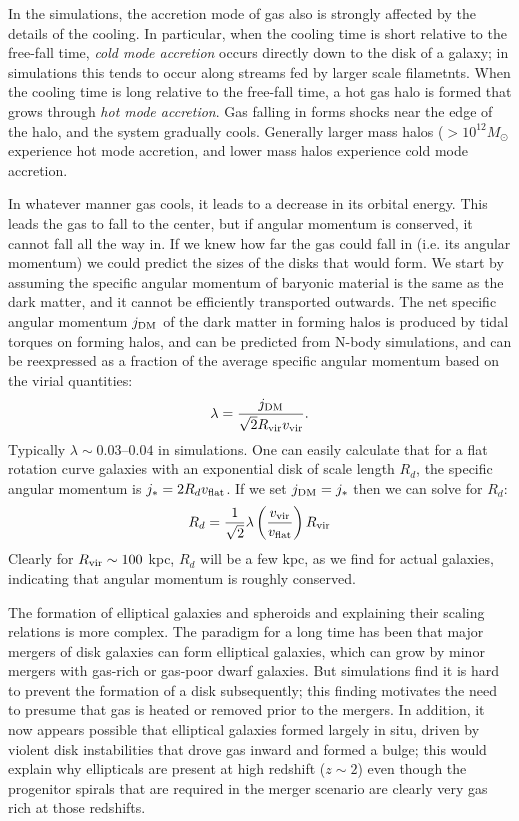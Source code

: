In the simulations, the accretion mode of gas also is strongly
affected by the details of the cooling. In particular, when the
cooling time is short relative to the free-fall time, {\it cold mode
accretion} occurs directly down to the disk of a galaxy; in
simulations this tends to occur along streams fed by larger scale
filametnts. When the cooling time is long relative to the free-fall
time, a hot gas halo is formed that grows through {\it hot mode
accretion}. Gas falling in forms shocks near the edge of the halo, and
the system gradually cools. Generally larger mass halos ($>10^{12}
M_\odot$ experience hot mode accretion, and lower mass halos
experience cold mode accretion. 

In whatever manner gas cools, it leads to a decrease in its orbital
energy. This leads the gas to fall to the center, but if angular
momentum is conserved, it cannot fall all the way in. If we knew how
far the gas could fall in (i.e. its angular momentum) we could predict
the sizes of the disks that would form. We start by assuming the
specific angular momentum of baryonic material is the same as the dark
matter, and it cannot be efficiently transported outwards. The net
specific angular momentum $j_{\rm DM}$ of the dark matter in forming
halos is produced by tidal torques on forming halos, and can be
predicted from N-body simulations, and can be reexpressed as a
fraction of the average specific angular momentum based on the virial
quantities:
\begin{equation}
\lambda = \frac{j_{\rm DM}}{\sqrt{2} R_{\rm vir} v_{\rm vir}}.
\end{equation}
Typically $\lambda \sim 0.03$--$0.04$ in simulations. One can easily
calculate that for a flat rotation curve galaxies with an exponential
disk of scale length $R_d$, the specific angular momentum is $j_\ast =
2 R_d v_{\rm flat}$. If we set $j_{\rm DM} = j_\ast$ then we can solve
for $R_d$:
\begin{equation}
R_d = \frac{1}{\sqrt{2}} \lambda \left(\frac{v_{\rm vir}}{v_{\rm
flat}}\right) R_{\rm vir}
\end{equation}
Clearly for $R_{\rm vir} \sim 100$ kpc, $R_d$ will be a few kpc, as we
find for actual galaxies, indicating that angular momentum is roughly
conserved.

The formation of elliptical galaxies and spheroids and explaining
their scaling relations is more complex. The paradigm for a long time
has been that major mergers of disk galaxies can form elliptical
galaxies, which can grow by minor mergers with gas-rich or gas-poor
dwarf galaxies. But simulations find it is hard to prevent the
formation of a disk subsequently; this finding motivates the need to
presume that gas is heated or removed prior to the mergers. In
addition, it now appears possible that elliptical galaxies formed
largely in situ, driven by violent disk instabilities that drove gas
inward and formed a bulge; this would explain why ellipticals are
present at high redshift ($z\sim 2$) even though the progenitor
spirals that are required in the merger scenario are clearly very gas
rich at those redshifts.


